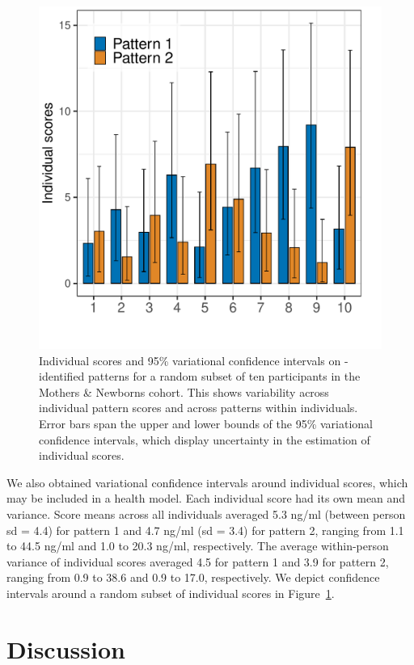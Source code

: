 \begin{figure}[!htbp]
\caption{Individual scores and 95\% variational confidence intervals on \bnmfc-identified patterns for a random subset of ten participants in the Mothers \& Newborns cohort. This shows variability across individual pattern scores and across patterns within individuals. Error bars span the upper and lower bounds of the 95\% variational confidence intervals, which display uncertainty in the estimation of individual scores.}
\label{fig:scores}
\centering
\includegraphics[scale = 0.5]{./figures/scores_w_vci.pdf}
\end{figure}

We also obtained variational confidence intervals around individual scores, which may be included in a health model. Each individual score had its own mean and variance. Score means across all individuals averaged 5.3 ng/ml (between person sd = 4.4) for pattern 1 and 4.7 ng/ml (sd = 3.4) for pattern 2, ranging from 1.1 to 44.5 ng/ml and 1.0 to 20.3 ng/ml, respectively. The average within-person variance of individual scores averaged 4.5 for pattern 1 and 3.9 for pattern 2, ranging from 0.9 to 38.6 and 0.9 to 17.0, respectively. We depict confidence intervals around a random subset of individual scores in Figure~\ref{fig:scores}.

\section{Discussion}

